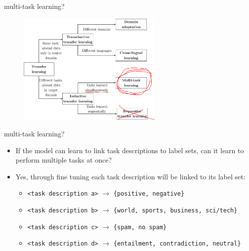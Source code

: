 
\begin{frame}{multi-task learning?}

\vfill

\begin{figure}
	\centering
		\includegraphics[width = 7cm]{figure/62-transfer_learning_taxonomy-anno.png}\\ 
\end{figure}

\vfill

\end{frame}


\begin{frame}{multi-task learning?}

\vfill

\begin{itemize}
	\item \ques If the model can learn to link task descriptions to label sets, can it learn to perform multiple tasks at once?
	\item Yes, through fine tuning each task description will be linked to its label set:
			\begin{itemize}
				\item \texttt{<task description a>} $\to$ \texttt{\{positive, negative\}}
				\item \texttt{<task description b>} $\to$ \texttt{\{world, sports, business, sci/tech\}} 
				\item \texttt{<task description c>} $\to$ \texttt{\{spam, no spam\}}
				\item \texttt{<task description d>} $\to$ \texttt{\{entailment, contradiction, neutral\}}
			\end{itemize}
\end{itemize}

\vfill

\end{frame}

